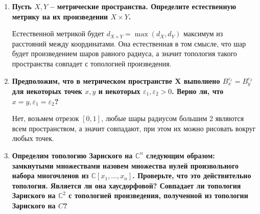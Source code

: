 \documentclass{article}
\begin{document}
\begin{enumerate}
    \item \textbf{Пусть $X,Y$ – метрические пространства. Определите
        естественную метрику на их произведении $X×Y$.}

        Естественной метрикой будет $d_{X\times Y}=\max(d_X,d_Y)$ максимум из
        расстояний между координатами. Она естественная в том смысле, что
        шар будет произведением шаров равного радиуса, а значит топология
        такого пространства совпадет с топологией произведения.

    \item \textbf{Предположим, что в метрическом пространстве X выполнено
        $B^{\varepsilon_1}_x=B^{\varepsilon_2}_y$ для некоторых точек $x,y$ и
        некоторых $\varepsilon_1,\varepsilon_2>0$. Верно ли, что $x=y,
        \varepsilon_1=\varepsilon_2$?}

        Нет, возьмем отрезок $[0,1]$, любые шары радиусом большим 2 являются
        всем пространством, а значит совпадают, при этом их можно рисовать
        вокруг любых точек.

    \item \textbf{Определим топологию Зариского на $\mathbb{C}^n$ следующим
        образом: замкнутыми множествами назовем множества нулей произвольного
        набора многочленов из $\mathbb{C}[x_1,...,x_n]$. Проверьте, что это
        действительно топология. Является ли она хаусдорфовой? Совпадает ли
        топология Зариского на $\mathbb{C}^2$ с топологией произведения,
        полученной из топологии Зариского на $C$?}
\end{enumerate}
\end{document}

